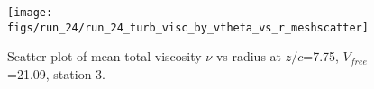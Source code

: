 \begin{figure}[H]
\centering
\texttt{[image: figs/run\_24/run\_24\_turb\_visc\_by\_vtheta\_vs\_r\_meshscatter]}
\caption{Scatter plot of mean total viscosity $\nu$ vs radius at $z/c$=7.75, $V_{free}$=21.09, station 3.}
\label{fig:run_24_turb_visc_by_vtheta_vs_r_meshscatter}
\end{figure}


